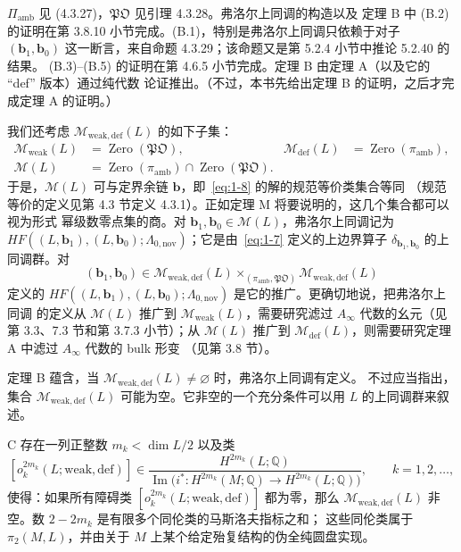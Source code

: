 $\Pi_{\mathrm{amb}}$ 见 (4.3.27)，$\mathfrak{PO}$ 见引理 4.3.28。弗洛尔上同调的构造以及
定理 B 中 (B.2) 的证明在第 3.8.10 小节完成。(B.1)，特别是弗洛尔上同调只依赖于对子
$(\mathbf b_1,\mathbf b_0)$ 这一断言，来自命题 4.3.29；该命题又是第 5.2.4 小节中推论 5.2.40 的结果。
(B.3)--(B.5) 的证明在第 4.6.5 小节完成。定理 B 由定理 A（以及它的 ``def'' 版本）通过纯代数
论证推出。（不过，本书先给出定理 B 的证明，之后才完成定理 A 的证明。）

我们还考虑 $\mathcal M_{\mathrm{weak,def}}(L)$ 的如下子集：
\[
\begin{aligned}
  \mathcal M_{\mathrm{weak}}(L)
    &=\operatorname{Zero}(\mathfrak{PO}),
  &\mathcal M_{\mathrm{def}}(L)
    &=\operatorname{Zero}(\pi_{\mathrm{amb}}),\\
  \mathcal M(L)
    &=\operatorname{Zero}(\pi_{\mathrm{amb}})
      \cap\operatorname{Zero}(\mathfrak{PO}).
\end{aligned}
\]
于是，$\mathcal M(L)$ 可与定界余链 $\mathbf b$，即~\eqref{eq:1-8} 的解的规范等价类集合等同
（规范等价的定义见第 4.3 节定义 4.3.1）。正如定理 M 将要说明的，这几个集合都可以视为形式
幂级数零点集的商。对 $\mathbf b_1,\mathbf b_0\in\mathcal M(L)$，弗洛尔上同调记为
$HF((L,\mathbf b_1),(L,\mathbf b_0);\Lambda_{0,\mathrm{nov}})$；它是由~\eqref{eq:1-7} 定义的上边界算子
$\delta_{\mathbf b_1,\mathbf b_0}$ 的上同调群。对
\[
  (\mathbf b_1,\mathbf b_0)\in
  \mathcal M_{\mathrm{weak,def}}(L)
  \mathbin{\times_{(\pi_{\mathrm{amb}},\mathfrak{PO})}}
  \mathcal M_{\mathrm{weak,def}}(L)
\]
定义的 $HF((L,\mathbf b_1),(L,\mathbf b_0);\Lambda_{0,\mathrm{nov}})$ 是它的推广。更确切地说，把弗洛尔上同调
的定义从 $\mathcal M(L)$ 推广到 $\mathcal M_{\mathrm{weak}}(L)$，需要研究滤过
$A_\infty$ 代数的幺元（见第 3.3、7.3 节和第 3.7.3 小节）；从 $\mathcal M(L)$ 推广到
$\mathcal M_{\mathrm{def}}(L)$，则需要研究定理 A 中滤过 $A_\infty$ 代数的 bulk 形变
（见第 3.8 节）。

定理 B 蕴含，当 $\mathcal M_{\mathrm{weak,def}}(L)\neq\varnothing$ 时，弗洛尔上同调有定义。
不过应当指出，集合 $\mathcal M_{\mathrm{weak,def}}(L)$ 可能为空。它非空的一个充分条件可以用
$L$ 的上同调群来叙述。

\begin{theorem}{C}\label{thm:C}
存在一列正整数 $m_k<\dim L/2$ 以及类
\[
  [o_k^{2m_k}(L;\mathrm{weak,def})]
  \in
  \frac{H^{2m_k}(L;\mathbb Q)}
  {\operatorname{Im}\bigl(i^*\colon H^{2m_k}(M;\mathbb Q)
  \to H^{2m_k}(L;\mathbb Q)\bigr)},
  \qquad k=1,2,\ldots,
\]
使得：如果所有障碍类 $[o_k^{2m_k}(L;\mathrm{weak,def})]$ 都为零，那么
$\mathcal M_{\mathrm{weak,def}}(L)$ 非空。数 $2-2m_k$ 是有限多个同伦类的马斯洛夫指标之和；
这些同伦类属于 $\pi_2(M,L)$，并由关于 $M$ 上某个给定殆复结构的伪全纯圆盘实现。
\end{theorem}

